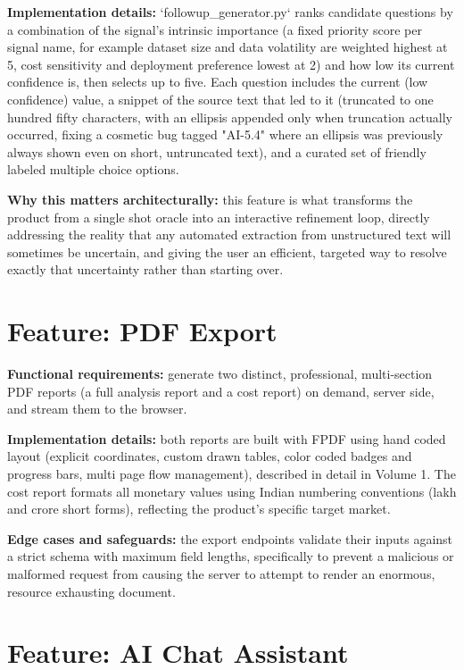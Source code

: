 \documentclass[11pt,a4paper]{report}
\begin{document}
\textbf{Implementation details:} `followup_generator.py` ranks candidate questions by a combination of the signal's intrinsic importance (a fixed priority score per signal name, for example dataset size and data volatility are weighted highest at 5, cost sensitivity and deployment preference lowest at 2) and how low its current confidence is, then selects up to five. Each question includes the current (low confidence) value, a snippet of the source text that led to it (truncated to one hundred fifty characters, with an ellipsis appended only when truncation actually occurred, fixing a cosmetic bug tagged "AI-5.4" where an ellipsis was previously always shown even on short, untruncated text), and a curated set of friendly labeled multiple choice options.

\textbf{Why this matters architecturally:} this feature is what transforms the product from a single shot oracle into an interactive refinement loop, directly addressing the reality that any automated extraction from unstructured text will sometimes be uncertain, and giving the user an efficient, targeted way to resolve exactly that uncertainty rather than starting over.

\section{Feature: PDF Export}

\textbf{Functional requirements:} generate two distinct, professional, multi-section PDF reports (a full analysis report and a cost report) on demand, server side, and stream them to the browser.

\textbf{Implementation details:} both reports are built with FPDF using hand coded layout (explicit coordinates, custom drawn tables, color coded badges and progress bars, multi page flow management), described in detail in Volume 1. The cost report formats all monetary values using Indian numbering conventions (lakh and crore short forms), reflecting the product's specific target market.

\textbf{Edge cases and safeguards:} the export endpoints validate their inputs against a strict schema with maximum field lengths, specifically to prevent a malicious or malformed request from causing the server to attempt to render an enormous, resource exhausting document.

\section{Feature: AI Chat Assistant}
\end{document}
